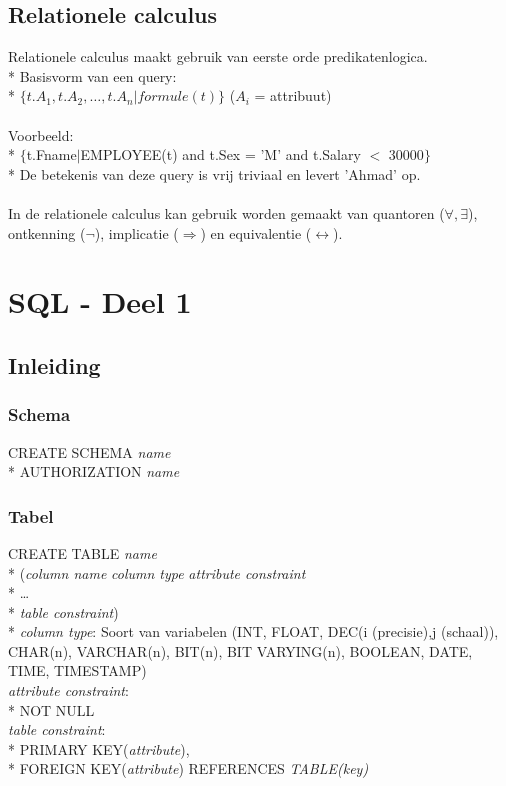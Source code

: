 \documentclass[10pt]{article}
\begin{document}
\subsection{Relationele calculus}
Relationele calculus maakt gebruik van eerste orde predikatenlogica.\\*
Basisvorm van een query:\\*
$\{t.A_1, t.A_2, \dots, t.A_n|formule(t)\}$ ($A_i$ = attribuut)\\\\
Voorbeeld:\\*
$\{$t.Fname$|$EMPLOYEE(t) and t.Sex = 'M' and t.Salary $<$ 30000$\}$\\*
De betekenis van deze query is vrij triviaal en levert 'Ahmad' op.\\\\
In de relationele calculus kan gebruik worden gemaakt van quantoren ($\forall, \exists$), ontkenning ($\neg$), implicatie ($\Rightarrow$) en equivalentie ($\leftrightarrow$).
\section{SQL - Deel 1}
\subsection{Inleiding}
\subsubsection{Schema}
CREATE SCHEMA \textit{name}\\*
AUTHORIZATION \textit{name}
\subsubsection{Tabel}
CREATE TABLE \textit{name}\\*
(\textit{column name} \textit{column type} \textit{attribute constraint}\\*
\dots\\*
\textit{table constraint})\\*
\textit{column type}: Soort van variabelen (INT, FLOAT, DEC(i (precisie),j (schaal)), CHAR(n), VARCHAR(n), BIT(n), BIT VARYING(n), BOOLEAN, DATE, TIME, TIMESTAMP)\\
\textit{attribute constraint}:\\*
NOT NULL\\
\textit{table constraint}:\\*
PRIMARY KEY(\textit{attribute}),\\*
FOREIGN KEY(\textit{attribute}) REFERENCES \textit{TABLE(key)}
\end{document}
